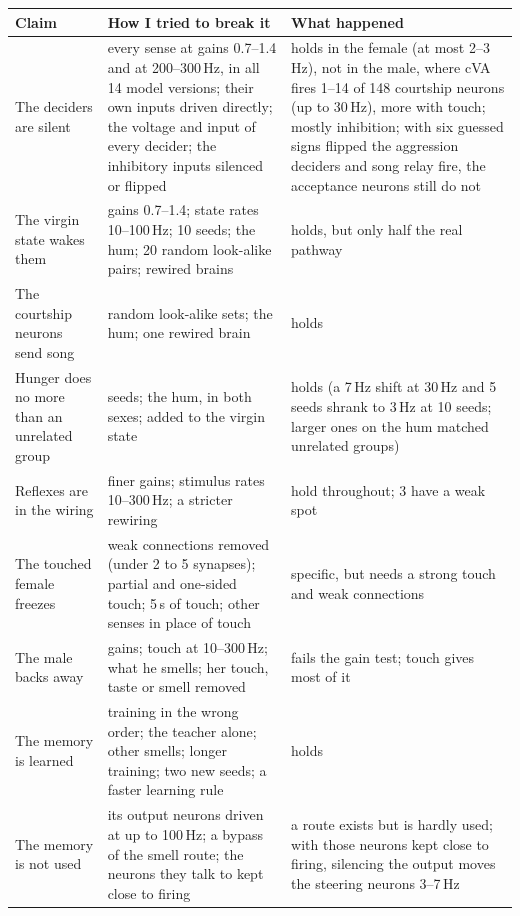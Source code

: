 \documentclass[11pt,a4paper]{article}
\begin{document}
\begin{table}[tbp]
\centering
\small
\renewcommand{\arraystretch}{1.12}
\begin{tabularx}{\textwidth}{@{}>{\RaggedRight}p{3.9cm}>{\RaggedRight}X>{\RaggedRight\arraybackslash}p{3.3cm}@{}}
\toprule
\textbf{Claim} & \textbf{How I tried to break it} & \textbf{What happened} \\
\midrule
The deciders are silent & every sense at gains 0.7--1.4 and at 200--300\,Hz, in all 14 model versions; their own inputs driven directly; the voltage and input of every decider; the inhibitory inputs silenced or flipped & holds in the female (at most 2--3\,Hz), not in the male, where cVA fires 1--14 of 148 courtship neurons (up to 30\,Hz), more with touch; mostly inhibition; with six guessed signs flipped the aggression deciders and song relay fire, the acceptance neurons still do not \\
The virgin state wakes them & gains 0.7--1.4; state rates 10--100\,Hz; 10 seeds; the hum; 20 random look-alike pairs; rewired brains & holds, but only half the real pathway \\
The courtship neurons send song & 20 random look-alike sets; the hum; one rewired brain & holds \\
Hunger does no more than an unrelated group & 10 seeds; the hum, in both sexes; added to the virgin state & holds (a 7\,Hz shift at 30\,Hz and 5 seeds shrank to 3\,Hz at 10 seeds; larger ones on the hum matched unrelated groups) \\
Reflexes are in the wiring & finer gains; stimulus rates 10--300\,Hz; a stricter rewiring & 2 hold throughout; 3 have a weak spot \\
The touched female freezes & weak connections removed (under 2 to 5 synapses); partial and one-sided touch; 5\,s of touch; other senses in place of touch & specific, but needs a strong touch and weak connections \\
The male backs away & gains; touch at 10--300\,Hz; what he smells; her touch, taste or smell removed & fails the gain test; touch gives most of it \\
The memory is learned & training in the wrong order; the teacher alone; other smells; longer training; two new seeds; a faster learning rule & holds \\
The memory is not used & its output neurons driven at up to 100\,Hz; a bypass of the smell route; the neurons they talk to kept close to firing & a route exists but is hardly used; with those neurons kept close to firing, silencing the output moves the steering neurons 3--7\,Hz \\

\end{tabularx}
\end{table}
\end{document}
